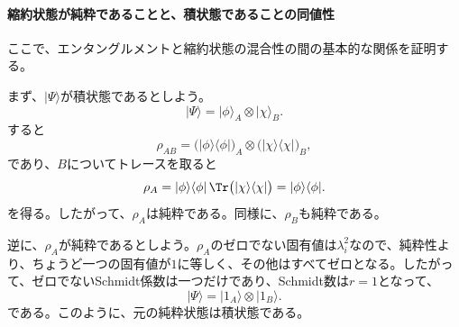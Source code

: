 \documentclass[a4paper,11pt,oneside]{article}
\theoremstyle{definition}
\numberwithin{equation}{section}
\begin{document}
\paragraph{縮約状態が純粋であることと、積状態であることの同値性}



ここで、エンタングルメントと縮約状態の混合性の間の基本的な関係を証明する。



まず、$|\Psi\rangle$が積状態であるとしよう。
\begin{equation}
|\Psi\rangle = |\phi\rangle_A \otimes |\chi\rangle_B .
\end{equation}
すると
\begin{equation}
\rho_{AB}
=
\bigl(|\phi\rangle\langle\phi|\bigr)_A
\otimes
\bigl(|\chi\rangle\langle\chi|\bigr)_B ,
\end{equation}
であり、$B$についてトレースを取ると
\begin{equation}
\rho_A
=
|\phi\rangle\langle\phi| \, \Tr\bigl(|\chi\rangle\langle\chi|\bigr)
=
|\phi\rangle\langle\phi| .
\end{equation}
を得る。したがって、$\rho_A$は純粋である。同様に、$\rho_B$も純粋である。



逆に、$\rho_A$が純粋であるとしよう。$\rho_A$のゼロでない固有値は$\lambda_i^2$なので、純粋性より、ちょうど一つの固有値が$1$に等しく、その他はすべてゼロとなる。したがって、ゼロでないSchmidt係数は一つだけであり、Schmidt数は$r=1$となって、
\begin{equation}
|\Psi\rangle = |1_A\rangle \otimes |1_B\rangle .
\end{equation}
である。このように、元の純粋状態は積状態である。
\end{document}

